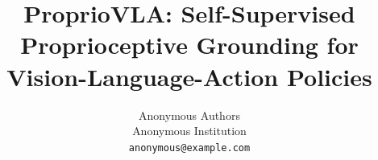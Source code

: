 \documentclass{article}
\title{ProprioVLA: Self-Supervised Proprioceptive Grounding for Vision-Language-Action Policies}
\author{%
  Anonymous Authors \\
  Anonymous Institution \\
  \texttt{anonymous@example.com}
}
\begin{document}
\maketitle

\begin{abstract}

\end{abstract}









\begin{ack}

\end{ack}




\appendix


\newpage

\end{document}
